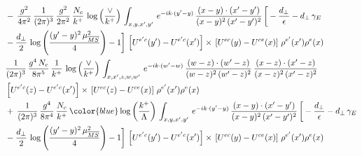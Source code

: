 \begin{align}
&   -\, \frac{g^{2}}{4\pi^{2}}\, \frac{1}{(2\pi)^{3}}\,\frac{g^{2}}{2\pi^{2}}\, \frac{N_{c}}{k^{+}}\,\log{\left(\frac{\vee}{k^{+}}\right)}\,\int_{x,y,x',y'}\,e^{-ik\cdot (y'-y)}\,\frac{(x-y)\cdot (x'-y')}{(x-y)^{2}\,(x'-y')^{2}}\,\bigg[-\frac{d_{\perp}}{\epsilon}-d_{\perp}\,\gamma_{E}\notag \\ &   -\frac{d_{\perp}}{2}\,\log{\left(\frac{(y'-y)^{2}\,\mu^{2}_{\overline{MS}}}{4}\right)}-1\bigg]\,\left[U^{e'c}(y') - U^{e'c}(x')\right] \times\, \left[U^{ec}(y) - U^{ce}(x)\right]\, \rho^{e'}(x') \rho^{e}(x) \notag \\
&   \frac{1}{(2\pi)^{3}}\,\frac{g^{4}\,N_{c}}{8\pi^{5}}\,\frac{1}{k^{+}}\,\log{\left(\frac{\vee}{k^{+}}\right)}\,\int_{x,x',z,w,w'}\,e^{-ik\cdot (w'-w)}\,\frac{(w-z)\cdot(w'-z)}{(w-z)^{2}\,(w'-z)^{2}}\,\frac{(x-z)\cdot(x'-z)}{(x-z)^{2}\,(x'-z)^{2}}\notag \\ &   \left[U^{e'c}(z) - U^{e'c}(x')\right] \times\, \left[U^{ec}(z) - U^{ce}(x)\right]\, \rho^{e'}(x') \rho^{e}(x) \notag \\ & +\,\frac{1}{(2\pi)^{3}}\,\frac{g^{4}}{8\pi^{4}}\, \frac{N_{c}}{k^{+}}\,{\color{blue}\log{\left(\frac{k^{+}}{\Lambda}\right)}}\,\int_{x,y,x',y'}\,e^{-ik\cdot (y'-y)}\,\frac{(x-y)\cdot (x'-y')}{(x-y)^{2}\,(x'-y')^{2}}\,\bigg[-\frac{d_{\perp}}{\epsilon}-d_{\perp}\,\gamma_{E}\notag \\ & -\frac{d_{\perp}}{2}\,\log{\left(\frac{(y'-y)^{2}\,\mu^{2}_{\overline{MS}}}{4}\right)}-1\bigg]\,\left[U^{e'c}(y') - U^{e'c}(x')\right] \times\, \left[U^{ec}(y) - U^{ce}(x)\right]\, \rho^{e'}(x') \rho^{e}(x)
\end{align}
